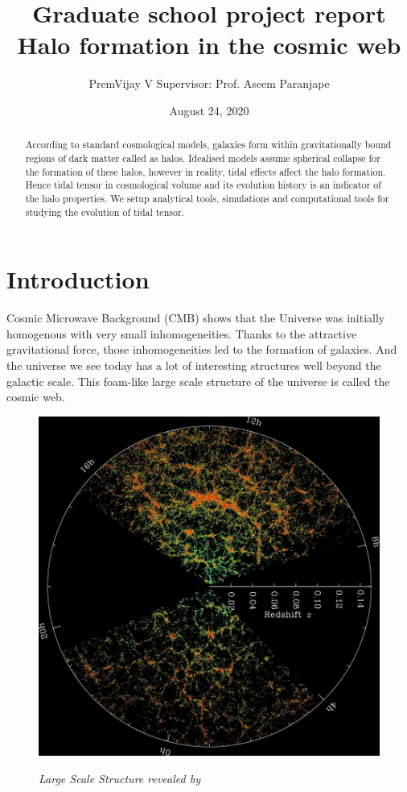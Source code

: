 \documentclass[12pt]{article}
\title{Graduate school project report\\
	Halo formation in the cosmic web}
\author{ PremVijay V \qquad Supervisor: Prof. Aseem Paranjape}
\date{August 24, 2020}
\begin{document}
\maketitle


\begin{abstract}
According to standard cosmological models, galaxies form within gravitationally bound regions of dark matter called as halos. Idealised models assume spherical collapse for the formation of these halos, however in reality, tidal effects affect the halo formation. Hence tidal tensor in cosmological volume and its evolution history is an indicator of the halo properties. We setup analytical tools, simulations and computational tools for studying the evolution of tidal tensor.

\end{abstract}


\section{Introduction}
Cosmic Microwave Background (CMB) shows that the Universe was initially homogenous with very small inhomogeneities. Thanks to the attractive gravitational force, those inhomogeneities led to the formation of galaxies. And the universe we see today has a lot of interesting structures well beyond the galactic scale. This foam-like large scale structure of the universe is called the cosmic web.  \hfill~
\\[-1cm]
\begin{figure}
	\centering
\hfill \includegraphics[width=0.9\linewidth]{orangepie}
\label{fig:orangepie}
\caption{ \textit{Large Scale Structure revealed by \cite{cite_sdss}}}
\end{figure}
\end{document}
